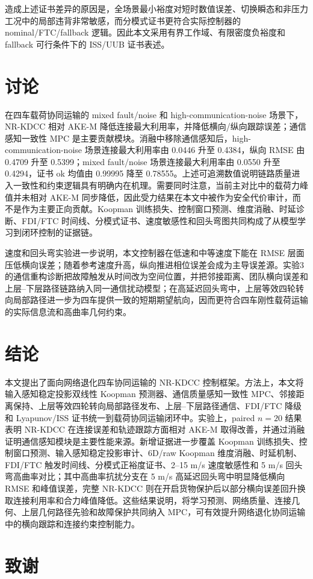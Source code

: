 \documentclass[twocolumn,3p,times,procedia]{elsarticle}
\newcommand{\todozh}[1]{\textcolor{red}{[To add: #1]}}
\newif\ifNRReview
\renewcommand{\todozh}[1]{\ifNRReview\textcolor{red}{[To add: #1]}\fi}
\newcommand{\AKE}{AKE-M}
\newcommand{\Method}{NR-KDCC}
\begin{document}
造成上述证书差异的原因是，全场景最小裕度对短时数值误差、切换瞬态和非压力工况中的局部违背非常敏感，而分模式证书更符合实际控制器的 nominal/FTC/fallback 逻辑。因此本文采用有界工作域、有限密度负裕度和 fallback 可行条件下的 ISS/UUB 证书表述。

\FloatBarrier

\section{讨论}

在四车载荷协同运输的 mixed fault/noise 和 high-communication-noise 场景下，\Method{} 相对 \AKE{} 降低连接最大利用率，并降低横向/纵向跟踪误差；通信感知一致性 MPC 是主要贡献模块。消融中移除通信感知后，high-communication-noise 场景连接最大利用率由 0.0446 升至 0.4384，纵向 RMSE 由 0.4709 升至 0.5399；mixed fault/noise 场景连接最大利用率由 0.0550 升至 0.4294，证书 ok 均值由 0.99995 降至 0.78555。上述可追溯数值说明链路质量进入一致性和约束逻辑具有明确内在机理。需要同时注意，当前主对比中的载荷力峰值并未相对 \AKE{} 同步降低，因此受力结果在本文中被作为安全代价审计，而不是作为主要正向贡献。Koopman 训练损失、控制窗口预测、维度消融、时延诊断、FDI/FTC 时间线、分模式证书、速度敏感性和回头弯图共同构成了从模型学习到闭环控制的证据链。

速度和回头弯实验进一步说明，本文控制器在低速和中等速度下能在 RMSE 层面压低横向误差；随着参考速度升高，纵向推进相位误差会成为主导误差源。实验3的通信重构诊断把故障触发从时间改为空间位置，并把邻接距离、团队横向误差和上层--下层路径链路纳入同一通信扰动模型；在高延迟回头弯中，上层等效四轮转向局部路径进一步为四车提供一致的短期期望航向，因而更符合四车刚性载荷运输的实际信息流和高曲率几何约束。


\section{结论}

本文提出了面向网络退化四车协同运输的 \Method{} 控制框架。方法上，本文将输入感知稳定投影双线性 Koopman 预测器、通信质量感知一致性 MPC、邻接距离保持、上层等效四轮转向局部路径发布、上层--下层路径通信、FDI/FTC 降级和 Lyapunov/ISS 证书统一到载荷协同运输闭环中。实验上，paired $n=20$ 结果表明 \Method{} 在连接误差和轨迹跟踪方面相对 \AKE{} 取得改善，并通过消融证明通信感知模块是主要性能来源。新增证据进一步覆盖 Koopman 训练损失、控制窗口预测、输入感知稳定投影审计、6D/raw Koopman 维度消融、时延机制、FDI/FTC 触发时间线、分模式正裕度证书、2--15 m/s 速度敏感性和 5 m/s 回头弯高曲率对比；其中高曲率抗扰分支在 5 m/s 高延迟回头弯中明显降低横向 RMSE 和峰值误差，完整 \Method{} 则在开启货物保护后以部分横向误差回升换取连接利用率和合力峰值降低。这些结果说明，将学习预测、网络质量、连接几何、上层几何路径先验和故障保护共同纳入 MPC，可有效提升网络退化协同运输中的横向跟踪和连接约束控制能力。

\section*{致谢}

\todozh{补充基金项目、课题编号和作者贡献声明。}

\FloatBarrier
\balance


\end{document}
